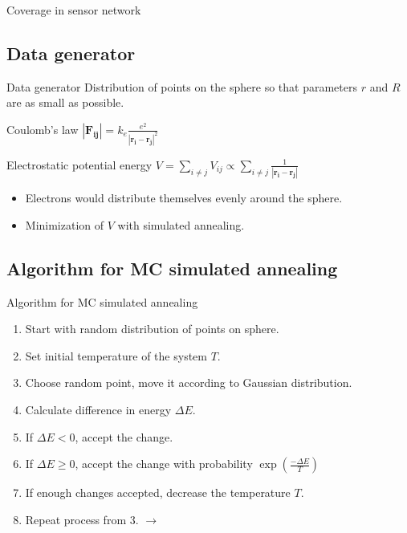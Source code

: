 \documentclass{beamer}
\newcommand{\vect}[1]{\boldsymbol{#1}}
\begin{document}
\begin{frame}{Coverage in sensor network}
\begin{figure}[!ht]
\end{figure}
\end{frame}












\subsection{Data generator}
\begin{frame}{Data generator}{}
Distribution of points on the sphere so that parameters $r$ and $R$ are as small as possible.
\begin{alertblock}{Coulomb's law}
	\centering $|\vect{F_{ij}}| = k_e \frac{e^2}{|\vect{r_i}-\vect{r_j}|^2}$
\end{alertblock}
\begin{alertblock}{Electrostatic potential energy}
	\centering $V = \sum_{i\neq j}V_{ij} \propto \sum_{i\neq j}\frac{1}{|\vect{r_i} - \vect{r_j}|}$
\end{alertblock}
\begin{itemize}
	\item {Electrons would distribute themselves evenly around the sphere. }
	\item {Minimization of $V$ with simulated annealing.}
\end{itemize}

\end{frame}

\subsection{Algorithm for MC simulated annealing}
\begin{frame}{Algorithm for MC simulated annealing}
\begin{enumerate}
	\item {Start with random distribution of points on sphere.}
	\item {Set initial temperature of the system $T$.}
	\item {Choose random point, move it according to Gaussian distribution.}
	\item {Calculate difference in energy $\Delta E$.}
	\item {If $\Delta E < 0$, accept the change.} 
	\item {If $\Delta E \geq 0$, accept the change with probability $\exp(\frac{-\Delta E}{T})$}
	\item {If enough changes accepted, decrease the temperature $T$.}
	\item {Repeat process from 3. $\longrightarrow$}
\end{enumerate}
\end{frame}
\end{document}

